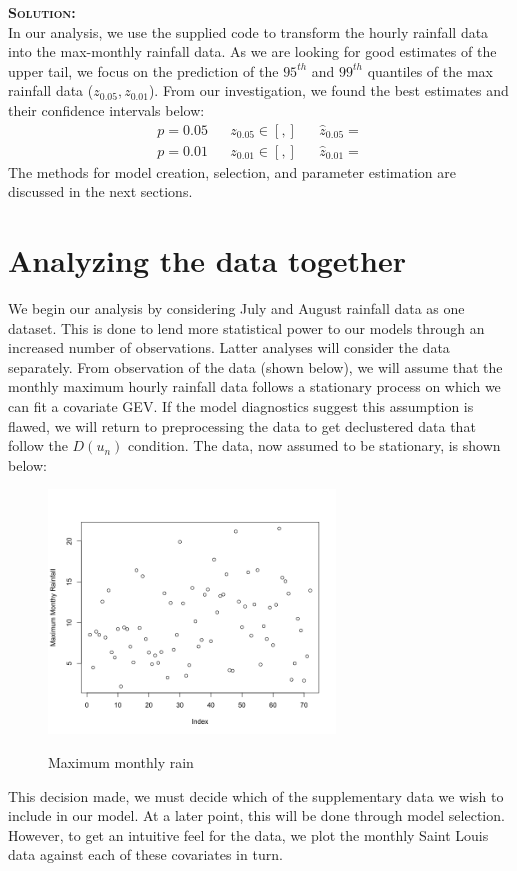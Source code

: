 \documentclass[12pt,oneside]{article}
\newenvironment{solution}
    {\textbf{\textsc{Solution:}}\\}
    {\newpage}
\begin{document}
\begin{solution}
In our analysis, we use the supplied code to transform the hourly rainfall data into the max-monthly rainfall data. As we are looking for good estimates of the upper tail, we focus on the prediction of the $95^{th}$ and $99^{th}$ quantiles of the max rainfall data ($z_{0.05},z_{0.01}$). From our investigation, we found the best estimates and their confidence intervals below:
\begin{align*}
    p= 0.05 &&z_{0.05}\in [ , ] && \hat{z}_{0.05}= \\
    p= 0.01 &&z_{0.01}\in [ , ] && \hat{z}_{0.01}= 
\end{align*}
The methods for model creation, selection, and parameter estimation are discussed in the next sections.
\section*{Analyzing the data together}
We begin our analysis by considering July and August rainfall data as one dataset. This is done to lend more statistical power to our models through an increased number of observations. Latter analyses will consider the data separately. From observation of the data (shown below), we will assume that the monthly maximum hourly rainfall data follows a stationary process on which we can fit a covariate GEV. If the model diagnostics suggest this assumption is flawed, we will return to preprocessing the data to get declustered data that follow the $D(u_n)$ condition. The data, now assumed to be stationary, is shown below:
\begin{figure}[H]
\begin{center}
{\includegraphics[width=3in]{Assignments/a3/rain.png}}
\caption{Maximum monthly rain}
\end{center}
\end{figure}
\noindent This decision made, we must decide which of the supplementary data we wish to include in our model. At a later point, this will be done through model selection. However, to get an intuitive feel for the data, we plot the monthly Saint Louis data against each of these covariates in turn.

\end{solution}
\end{document}
